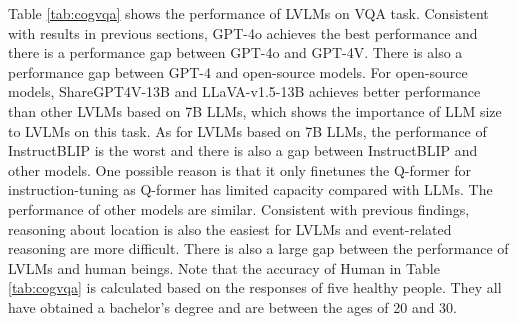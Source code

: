 Table \ref{tab:cogvqa} shows the performance of LVLMs on VQA task. 
Consistent with results in previous sections, GPT-4o achieves the best performance and there is a performance gap between GPT-4o and GPT-4V.
There is also a performance gap between GPT-4 and open-source models.
For open-source models, ShareGPT4V-13B and LLaVA-v1.5-13B achieves better performance than other LVLMs based on 7B LLMs, which shows the importance of LLM size to LVLMs on this task.
As for LVLMs based on 7B LLMs, the performance of InstructBLIP is the worst and there is also a gap between InstructBLIP and other models. 
One possible reason is that it only finetunes the Q-former for instruction-tuning as Q-former has limited capacity compared with LLMs.
The performance of other models are similar.
Consistent with previous findings, reasoning about location is also the easiest for LVLMs and event-related reasoning are more difficult.
There is also a large gap between the performance of LVLMs and human beings.
Note that the accuracy of Human in Table \ref{tab:cogvqa} is calculated based on the responses of five healthy people. They all have obtained a bachelor's degree and are between the ages of 20 and 30.


